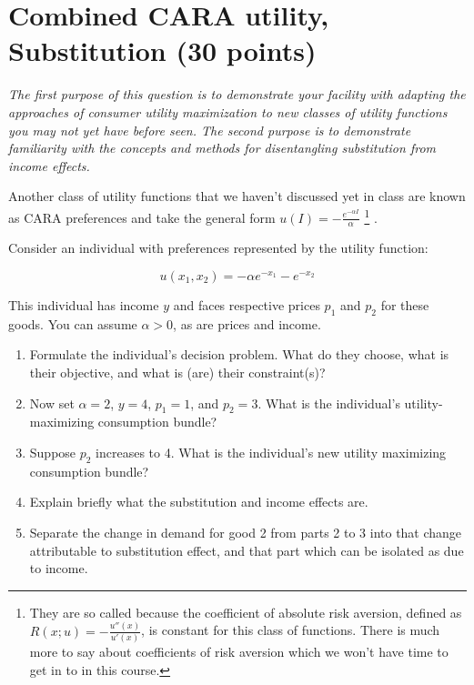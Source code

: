 \documentclass{article}
\begin{document}
\section*{Combined CARA utility, Substitution (30 points)}

\small{\textit{The first purpose of this question is to demonstrate your facility with adapting the approaches of consumer utility maximization to new classes of utility functions you may not yet have before seen. The second purpose is to demonstrate familiarity with the concepts and methods for disentangling substitution from income effects.}}

Another class of utility functions that we haven't discussed yet in class are known as CARA preferences and take the general form $u(I) = -\frac{e^{-\alpha I}}{\alpha}$
\footnote{
	They are so called because the coefficient of absolute risk aversion, defined as $R(x; u) = -\frac{u''(x)}{u'(x)}$, is constant for this class of functions. There is much more to say about coefficients of risk aversion which we won't have time to get in to in this course.
}
.

Consider an individual with preferences represented by the utility function:

\[ u(x_1, x_2) = - \alpha e^{-x_1} - e^{-x_2} \]

This individual has income $y$ and faces respective prices $p_1$ and $p_2$ for these goods. You can assume $\alpha > 0$, as are prices and income.

\begin{enumerate}
\item Formulate the individual's decision problem. What do they choose, what is their objective, and what is (are) their constraint(s)?

\item Now set $\alpha = 2$, $y = 4$, $p_1 = 1$, and $p_2 = 3$. What is the individual's utility-maximizing consumption bundle?

\item Suppose $p_2$ increases to 4. What is the individual's new utility maximizing consumption bundle?

\item Explain briefly what the substitution and income effects are.

\item Separate the change in demand for good 2 from parts 2 to 3 into that change attributable to substitution effect, and that part which can be isolated as due to income.
\end{enumerate}
\end{document}
